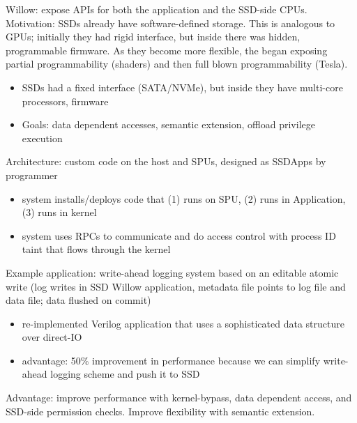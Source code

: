 \documentclass{article}
\begin{document}
\noindent\cite{seshadri:osdi2014-willow} Willow: expose APIs for both the application and the SSD-side CPUs.\\
Motivation: SSDs already have software-defined storage. This is analogous to GPUs; initially they had rigid interface, but inside there was hidden, programmable firmware. As they become more flexible, the began exposing partial programmability (shaders) and then full blown programmability (Tesla).
\begin{itemize}
	\item SSDs had a fixed interface (SATA/NVMe), but inside they have multi-core processors, firmware
	\item Goals: data dependent accesses, semantic extension, offload privilege execution
\end{itemize}
Architecture: custom code on the host and SPUs, designed as SSDApps by programmer
\begin{itemize}
	\item system installs/deploys code that (1) runs on SPU, (2) runs in Application, (3) runs in kernel
	\item system uses RPCs to communicate and do access control with process ID taint that flows through the kernel
\end{itemize}
Example application: write-ahead logging system based on an editable atomic write (log writes in SSD Willow application, metadata file points to log file and data file; data flushed on commit)
\begin{itemize}
	\item re-implemented Verilog application that uses a sophisticated data structure over direct-IO
	\item advantage: 50\% improvement in performance because we can simplify write-ahead logging scheme and push it to SSD
\end{itemize}
Advantage: improve performance with kernel-bypass, data dependent access, and SSD-side permission checks. Improve flexibility with semantic extension. 


	

  



\newpage
\onecolumn
\appendix
\end{document}
